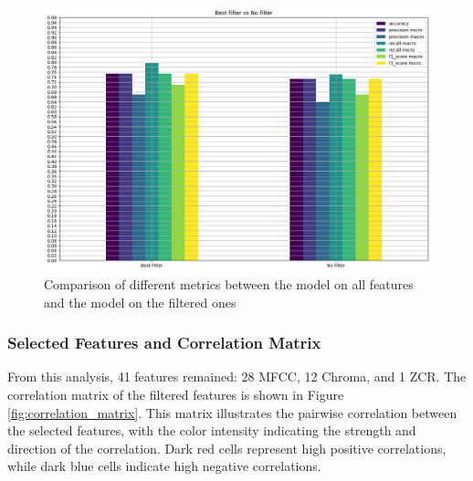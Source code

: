 \begin{figure}[h]
    \centering
    \includegraphics[width=\columnwidth]{../images/model_on_all_features_vs_model_on_best.png}
    \caption{Comparison of different metrics between the model on all features and the model on the filtered ones}
    \label{fig:comparison_model_on_all_features_vs_model_on_best}
\end{figure}

\subsubsection*{Selected Features and Correlation Matrix}

From this analysis, 41 features remained: 28 MFCC, 12 Chroma, and 1 ZCR.
The correlation matrix of the filtered features is shown in Figure \ref{fig:correlation_matrix}.
This matrix illustrates the pairwise correlation between the selected features, with the color intensity
indicating the strength and direction of the correlation. Dark red cells represent high positive correlations,
while dark blue cells indicate high negative correlations.


